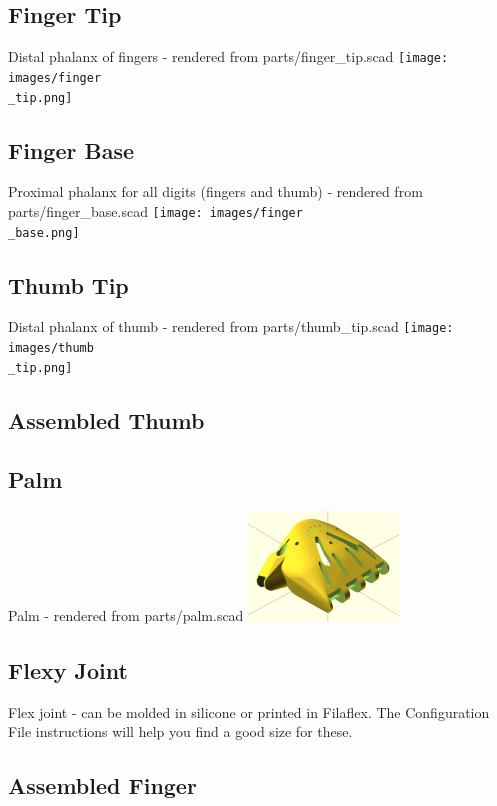 \documentclass[11pt]{article}
\begin{document}
\hypertarget{thing_finger\_tip}{\subsection{Finger Tip}}
Distal phalanx of fingers - rendered from parts/finger_tip.scad
\texttt{[image: images/finger\\\_tip.png]}

\hypertarget{thing_finger\_base}{\subsection{Finger Base}}
Proximal phalanx for all digits (fingers and thumb) - rendered from parts/finger_base.scad
\texttt{[image: images/finger\\\_base.png]}

\hypertarget{thing_thumb\_tip}{\subsection{Thumb Tip}}
Distal phalanx of thumb - rendered from parts/thumb_tip.scad
\texttt{[image: images/thumb\\\_tip.png]}

\hypertarget{thing_thumb\_assembly}{\subsection{Assembled Thumb}}

\hypertarget{thing_palm}{\subsection{Palm}}
Palm - rendered from parts/palm.scad
\includegraphics[width=4cm]{images/palm.png}

\hypertarget{thing_flexy\_joint}{\subsection{Flexy Joint}}
Flex joint - can be molded in silicone or printed in Filaflex. The Configuration File instructions will help you find a good size for these.

\hypertarget{thing_finger\_assembly}{\subsection{Assembled Finger}}
\end{document}
